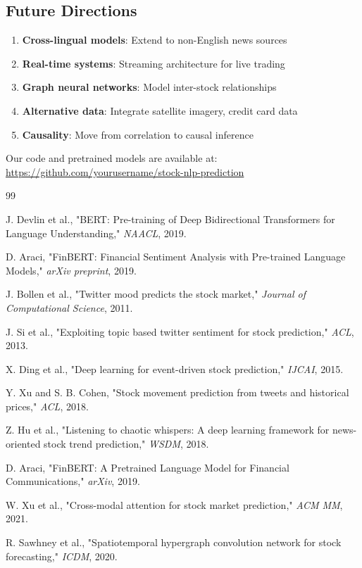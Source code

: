 \documentclass[conference]{IEEEtran}
\begin{document}
\subsection{Future Directions}

\begin{enumerate}
    \item \textbf{Cross-lingual models}: Extend to non-English news sources
    \item \textbf{Real-time systems}: Streaming architecture for live trading
    \item \textbf{Graph neural networks}: Model inter-stock relationships
    \item \textbf{Alternative data}: Integrate satellite imagery, credit card data
    \item \textbf{Causality}: Move from correlation to causal inference
\end{enumerate}

Our code and pretrained models are available at: \url{https://github.com/yourusername/stock-nlp-prediction}

\begin{thebibliography}{99}

J. Devlin et al., "BERT: Pre-training of Deep Bidirectional Transformers for Language Understanding," \textit{NAACL}, 2019.

D. Araci, "FinBERT: Financial Sentiment Analysis with Pre-trained Language Models," \textit{arXiv preprint}, 2019.

J. Bollen et al., "Twitter mood predicts the stock market," \textit{Journal of Computational Science}, 2011.

J. Si et al., "Exploiting topic based twitter sentiment for stock prediction," \textit{ACL}, 2013.

X. Ding et al., "Deep learning for event-driven stock prediction," \textit{IJCAI}, 2015.

Y. Xu and S. B. Cohen, "Stock movement prediction from tweets and historical prices," \textit{ACL}, 2018.

Z. Hu et al., "Listening to chaotic whispers: A deep learning framework for news-oriented stock trend prediction," \textit{WSDM}, 2018.

D. Araci, "FinBERT: A Pretrained Language Model for Financial Communications," \textit{arXiv}, 2019.

W. Xu et al., "Cross-modal attention for stock market prediction," \textit{ACM MM}, 2021.

R. Sawhney et al., "Spatiotemporal hypergraph convolution network for stock forecasting," \textit{ICDM}, 2020.

\end{thebibliography}
\end{document}
